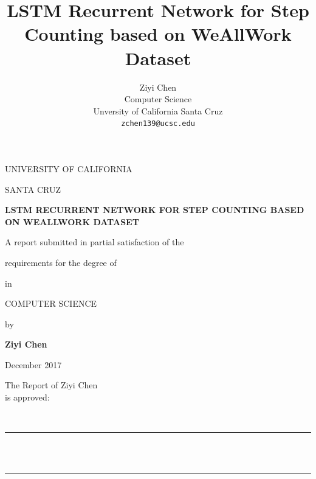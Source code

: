 \documentclass[11pt]{article}
\title{LSTM Recurrent Network for Step Counting based on WeAllWork Dataset}
\author{Ziyi Chen \\
  Computer Science  \\
  Unversity of California Santa Cruz\\
  {\tt zchen139@ucsc.edu}}
\date{}
\begin{document}
\onecolumn

{
    {\setcounter{page}{0}}
  
  \enlargethispage{\footskip}

  \begin{center}
  \Large
    UNIVERSITY OF CALIFORNIA \par
    \smallskip
    {\expandafter\uppercase\expandafter{SANTA CRUZ}} \par
    \bigskip
    {\bfseries {\expandafter\uppercase\expandafter{LSTM Recurrent Network for Step Counting based on WeAllWork Dataset}} \par}
    \medskip
    A report submitted in partial satisfaction of the \par
    requirements for the degree of \par
    \bigskip
    {\expandafter{}} \par
    \bigskip
    in \par
    \bigskip
    {\expandafter\uppercase\expandafter{COMPUTER SCIENCE}} \par
    \bigskip
    by \par
    \bigskip
    {\bfseries Ziyi Chen} \par
    \bigskip
    December 2017 \par
  \end{center}

\vfill
\begin{center}
\Large
\hfill \parbox{3in}{The Report of {Ziyi Chen}\\ is approved:} \\
\bigskip \bigskip \medskip
\hfill\rule{2.6in}{0.5pt}\\
\hfill{}\\
\bigskip \medskip
\hfill\rule{2.6in}{0.5pt}\\
\hfill{}\\
\bigskip \smallskip
\end{center}



\maketitle
\begin{abstract}


\end{abstract}}
\end{document}
